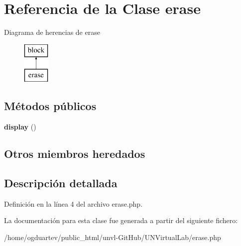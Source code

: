 \hypertarget{classerase}{}\section{Referencia de la Clase erase}
\label{classerase}
Diagrama de herencias de erase\begin{figure}[H]
\begin{center}
\leavevmode
\includegraphics[height=2.000000cm]{classerase}
\end{center}
\end{figure}
\subsection*{Métodos públicos}
\begin{DoxyCompactItemize}
\item 
\mbox{\label{classerase_a1d79faabec523c39a5662d10682acec8}} 
{\bfseries display} ()
\end{DoxyCompactItemize}
\subsection*{Otros miembros heredados}


\subsection{Descripción detallada}


Definición en la línea 4 del archivo erase.\+php.



La documentación para esta clase fue generada a partir del siguiente fichero\+:\begin{DoxyCompactItemize}
\item 
/home/ogduartev/public\+\_\+html/unvl-\/\+Git\+Hub/\+U\+N\+Virtual\+Lab/erase.\+php\end{DoxyCompactItemize}
